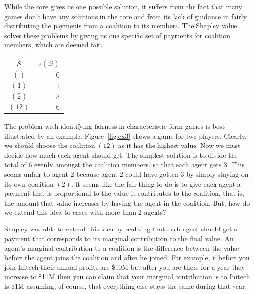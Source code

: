 While the core gives us one possible solution, it suffers from the
fact that many games don't have any solutions in the core and from its
lack of guidance in fairly distributing the payments from a coalition
to its members. The Shapley value solves these problems by giving us
one specific set of payments for coalition members, which are deemed
fair.

\begin{SCfigure}
  \begin{minipage}{1.0\linewidth}
  \centering
  \begin{tabular}{cr} \toprule
    $S$ & $v(S)$ \\ \midrule
    $()$ & \emph{$0$} \\ 
    $(1)$ & \emph{$1$} \\
    $(2)$ & \emph{$3$}\\ 
    $(12)$& \emph{$6$}\\ \bottomrule
  \end{tabular}
  \end{minipage}
  \caption{Example game. If the agents form coalition $(12)$ then how
    much utility should each one get?}
  \label{fig:ex3}
\end{SCfigure}


The problem with identifying fairness in characteristic form games is
best illustrated by an example. Figure~\ref{fig:ex3} shows a game for
two players. Clearly, we should choose the coalition $(12)$ as it has
the highest value. Now we must decide how much each agent should get.
The simplest solution is to divide the total of 6 evenly amongst the
coalition members, so that each agent gets 3. This seems unfair to
agent 2 because agent 2 could have gotten 3 by simply staying on its
own coalition $(2)$. It seems like the fair thing to do is to give
each agent a payment that is proportional to the value it contributes
to the coalition, that is, the amount that value increases by having
the agent in the coalition. But, how do we extend this idea to cases
with more than 2 agents?

Shapley was able to extend this idea by realizing that each agent
should get a payment that corresponds to its marginal contribution to
the final value. An agent's marginal contribution to a coalition is
the difference between the value before the agent joins the coalition
and after he joined. For example, if before you join Initech their
annual profits are \$10M but after you are there for a year they
increase to \$11M then you can claim that your marginal contribution
is to Initech is \$1M assuming, of course, that everything else stays
the same during that year.

